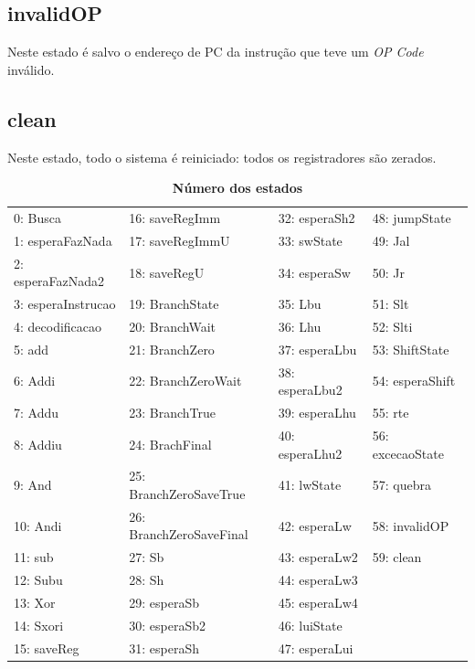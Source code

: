 \documentclass{article}
\begin{document}
    \subsection{invalidOP}
    Neste estado é salvo o endereço de PC da instrução que teve um {\it OP Code} inválido.
    
    \subsection{clean}
    Neste estado, todo o sistema é reiniciado: todos os registradores são zerados.
    
    \newpage
    \begin{center}
        \begin{table}[]
        \centering
        \caption{\textbf{Número dos estados}}
        \label{my-label}
        \begin{tabular}{llll}
        \\
        0: Busca           & 16: saveRegImm          & 32: esperaSh2  & 48: jumpState    \\
        1: esperaFazNada   & 17: saveRegImmU         & 33: swState    & 49: Jal          \\
        2: esperaFazNada2  & 18: saveRegU            & 34: esperaSw   & 50: Jr           \\
        3: esperaInstrucao & 19: BranchState         & 35: Lbu        & 51: Slt          \\
        4: decodificacao   & 20: BranchWait          & 36: Lhu        & 52: Slti         \\
        5: add             & 21: BranchZero          & 37: esperaLbu  & 53: ShiftState   \\
        6: Addi            & 22: BranchZeroWait      & 38: esperaLbu2 & 54: esperaShift  \\
        7: Addu            & 23: BranchTrue          & 39: esperaLhu  & 55: rte          \\
        8: Addiu           & 24: BrachFinal          & 40: esperaLhu2 & 56: excecaoState \\
        9: And             & 25: BranchZeroSaveTrue  & 41: lwState    & 57: quebra       \\
        10: Andi           & 26: BranchZeroSaveFinal & 42: esperaLw   & 58: invalidOP    \\
        11: sub            & 27: Sb                  & 43: esperaLw2  & 59: clean        \\
        12: Subu           & 28: Sh                  & 44: esperaLw3  &                  \\
        13: Xor            & 29: esperaSb            & 45: esperaLw4  &                  \\
        14: Sxori          & 30: esperaSb2           & 46: luiState   &                  \\
        15: saveReg        & 31: esperaSh            & 47: esperaLui  &                  \\               
        \end{tabular}
        \end{table}
    \end{center}
    
\end{document}
